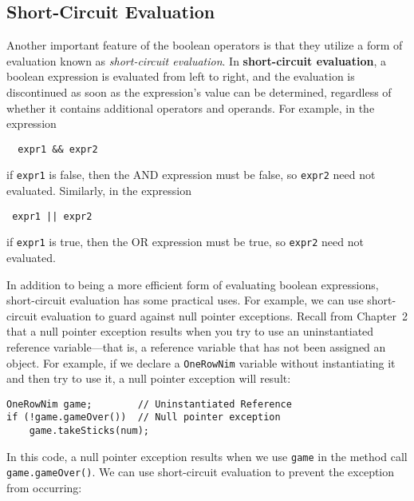 \subsection{Short-Circuit Evaluation}

\noindent Another important feature of the boolean operators
is that they utilize a form of evaluation known as {\em short-circuit
evaluation}. In {\bf short-circuit evaluation}, a boolean expression is
evaluated from left to right, and the evaluation is discontinued as
soon as the expression's value can be determined, regardless of
whether it contains additional operators and operands. For example,
in the expression

\begin{jjjlisting}
\begin{lstlisting}
  expr1 && expr2
\end{lstlisting}
\end{jjjlisting}

\noindent if {\tt expr1} is false, then the AND expression must be
false, so {\tt expr2} need not evaluated.  Similarly, in the expression

\begin{jjjlisting}
\begin{lstlisting}
 expr1 || expr2
\end{lstlisting}
\end{jjjlisting}

\noindent if {\tt expr1} is true, then the OR expression must be true, so
{\tt expr2} need not evaluated.

In addition to being a more efficient form of evaluating boolean
expressions, short-circuit evaluation has some practical uses. For
example, we can use short-circuit evaluation to guard against null
pointer exceptions.  Recall from Chapter~2 that a null pointer
exception results when you try to use an uninstantiated reference
variable---that is, a reference variable that has not been assigned an
object. For example, if we declare a {\tt OneRowNim} variable without
instantiating it and then try to use it, a null pointer exception will
result:

\begin{jjjlisting}
\begin{lstlisting}
OneRowNim game;        // Uninstantiated Reference
if (!game.gameOver())  // Null pointer exception
    game.takeSticks(num);
\end{lstlisting}
\end{jjjlisting}

\noindent In this code, a null pointer exception results when we
use {\tt game} in the method call {\tt game.gameOver()}.  We can use
short-circuit evaluation to prevent the exception from occurring:

